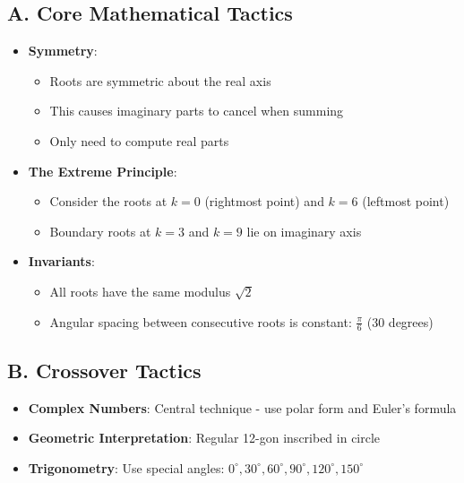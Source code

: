 \documentclass[11pt]{article}
\begin{document}
\begin{tacticalbox}
\subsection*{A. Core Mathematical Tactics}
\begin{itemize}[leftmargin=*]
    \item \textbf{Symmetry}: 
    \begin{itemize}
        \item Roots are symmetric about the real axis
        \item This causes imaginary parts to cancel when summing
        \item Only need to compute real parts
    \end{itemize}
    \item \textbf{The Extreme Principle}: 
    \begin{itemize}
        \item Consider the roots at $k=0$ (rightmost point) and $k=6$ (leftmost point)
        \item Boundary roots at $k=3$ and $k=9$ lie on imaginary axis
    \end{itemize}
    \item \textbf{Invariants}: 
    \begin{itemize}
        \item All roots have the same modulus $\sqrt{2}$
        \item Angular spacing between consecutive roots is constant: $\frac{\pi}{6}$ (30 degrees)
    \end{itemize}
\end{itemize}

\subsection*{B. Crossover Tactics}
\begin{itemize}[leftmargin=*]
    \item \textbf{Complex Numbers}: Central technique - use polar form and Euler's formula
    \item \textbf{Geometric Interpretation}: Regular 12-gon inscribed in circle
    \item \textbf{Trigonometry}: Use special angles: $0^\circ, 30^\circ, 60^\circ, 90^\circ, 120^\circ, 150^\circ$
\end{itemize}
\end{tacticalbox}
\end{document}
